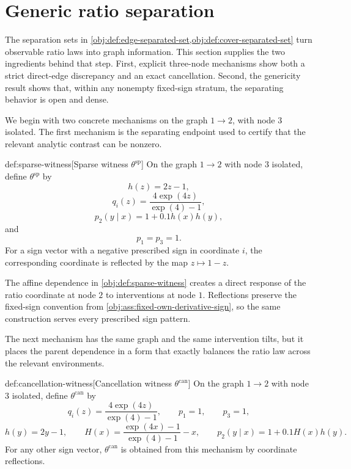 \section{Generic ratio separation}\label{sec:generic-separation}

The separation sets in \cref{obj:def:edge-separated-set,obj:def:cover-separated-set} turn observable ratio laws into graph information. This section supplies the two ingredients behind that step. First, explicit three-node mechanisms show both a strict direct-edge discrepancy and an exact cancellation. Second, the genericity result shows that, within any nonempty fixed-sign stratum, the separating behavior is open and dense.

We begin with two concrete mechanisms on the graph \(1\to2\), with node \(3\) isolated. The first mechanism is the separating endpoint used to certify that the relevant analytic contrast can be nonzero.

\begin{definitionv}{def:sparse-witness}[Sparse witness \(\theta^{\mathrm{sp}}\)]
On the graph \(1\to2\) with node \(3\) isolated, define \(\theta^{\mathrm{sp}}\) by
\[
h(z)=2z-1,
\]
\[
q_i(z)=\frac{4\exp(4z)}{\exp(4)-1},
\]
\[
p_2(y\mid x)=1+0.1h(x)h(y),
\]
and
\[
p_1=p_3=1.
\]
For a sign vector with a negative prescribed sign in coordinate \(i\), the corresponding coordinate is reflected by the map \(z\mapsto1-z\).
\end{definitionv}

The affine dependence in \cref{obj:def:sparse-witness} creates a direct response of the ratio coordinate at node \(2\) to interventions at node \(1\). Reflections preserve the fixed-sign convention from \cref{obj:ass:fixed-own-derivative-sign}, so the same construction serves every prescribed sign pattern.

The next mechanism has the same graph and the same intervention tilts, but it places the parent dependence in a form that exactly balances the ratio law across the relevant environments.

\begin{definitionv}{def:cancellation-witness}[Cancellation witness $\theta^{\mathrm{can}}$]
On the graph \(1\to2\) with node \(3\) isolated, define \(\theta^{\mathrm{can}}\) by
\[
q_i(z)=\frac{4\exp(4z)}{\exp(4)-1},
\qquad
p_1=1,
\qquad
p_3=1,
\]
\[
h(y)=2y-1,
\qquad
H(x)=\frac{\exp(4x)-1}{\exp(4)-1}-x,
\qquad
p_2(y\mid x)=1+0.1H(x)h(y).
\]
For any other sign vector, \(\theta^{\mathrm{can}}\) is obtained from this mechanism by coordinate reflections.
\end{definitionv}


